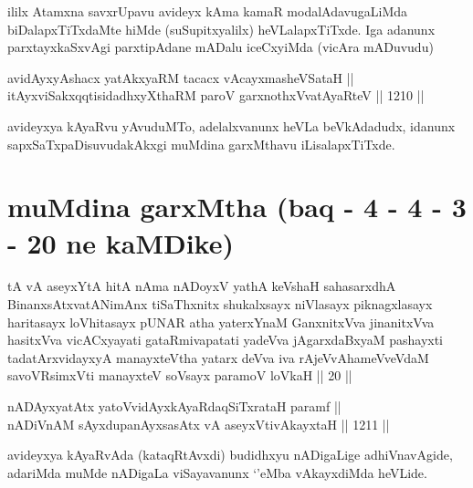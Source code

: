\begin{artha}
ililx Atamxna savxrUpavu avideyx kAma kamaR modalAdavugaLiMda biDalapxTiTxdaMte hiMde (suSupitxyalilx) heVLalapxTiTxde. Iga adanunx parxtayxkaSxvAgi parxtipAdane mADalu iceCxyiMda (vicAra mADuvudu)
\end{artha}


\begin{shl}
avidAyxyAshacx yatAkxyaRM tacacx vAcayxmasheVSataH || \\
itAyxviSakxqqtisidadhxyXthaRM paroV garxnothxV\s vatAyaRteV \hfill || 1210 ||  
\end{shl}

\begin{artha}
avideyxya kAyaRvu yAvuduMTo, adelalxvanunx heVLa beVkAdadudx, idanunx sapxSaTxpaDisuvudakAkxgi muMdina garxMthavu iLisalapxTiTxde.
\end{artha}

\section*{muMdina garxMtha (baq - 4 - 4 - 3 - 20 ne kaMDike)}

\begin{shl}
tA vA aseyxYtA hitA nAma nADoyxV yathA keVshaH sahasarxdhA BinanxsAtxvatANimAnx tiSaThxnitx shukalxsayx niVlasayx piknagxlasayx haritasayx loVhitasayx pUNAR atha yaterxYnaM GanxnitxVva jinanitxVva hasitxVva vicACxyayati gataRmivapatati yadeVva jAgarxdaBxyaM pashayxti tadatArxvidayxyA manayxteV\s tha yatarx deVva iva rAjeVvAhameVveVdaM savoVR\s simxVti manayxteV soV\s sayx paramoV loVkaH || 20 ||
\end{shl}



\begin{shl}
nADAyxyatAtx yatoV\s vidAyxkAyaRdaqSiTxrataH paramf || \\
nADiVnAM sAyxdupanAyxsasAtx vA aseyxVtivAkayxtaH \hfill || 1211 ||  
\end{shl}

\begin{artha}
avideyxya kAyaRvAda (kataqRtAvxdi) budidhxyu nADigaLige adhiVnavAgide, adariMda muMde nADigaLa viSayavanunx `\stext'eMba vAkayxdiMda heVLide.
\end{artha}

